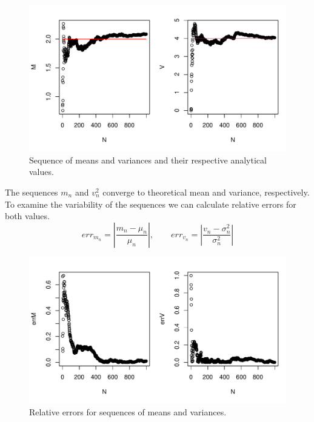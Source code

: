 \documentclass[12pt, a4paper]{article}\usepackage[]{graphicx}\usepackage[]{color}
\makeatletter
\def\maxwidth{ %
  \ifdim\Gin@nat@width>\linewidth
    \linewidth
  \else
    \Gin@nat@width
  \fi
}
\newenvironment{knitrout}{}{} %
\makeatother
\begin{document}
\begin{knitrout}
\color{fgcolor}\begin{figure}[H]

{\centering \includegraphics[width=\maxwidth]{figure/ex1_2seq-1} 

}

\caption[Sequence of means and variances and their respective analytical values]{Sequence of means and variances and their respective analytical values.}\label{fig:ex1.2seq}
\end{figure}


\end{knitrout}

The sequences $m_n$ and $v_n^2$ converge to theoretical mean and variance, respectively. To examine the variability of the sequences we can calculate relative errors for both values.
\[ err_{m_n} = \left| \frac{m_n - \mu_n}{\mu_n}  \right| , \qquad
   err_{v_n} = \left| \frac{v_n - \sigma_n^2}{\sigma_n^2}  \right| \]

\begin{knitrout}
\color{fgcolor}\begin{figure}[H]

{\centering \includegraphics[width=\maxwidth]{figure/ex1_2err-1} 

}

\caption[Relative errors for sequences of means and variances]{Relative errors for sequences of means and variances.}\label{fig:ex1.2err}
\end{figure}


\end{knitrout}
\end{document}
